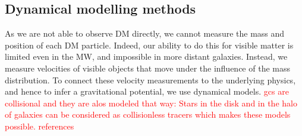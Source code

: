 \iffalse
\subsubsection{Application}
MW \acp{GC} proper motions and dynamics (including action distribution and dynamical model of potentials): \cite{Vasiliev...GCdynsGaiaDR2...2018}\\
Modelling the \ac{MW}'s \ac{GC} system: \cite{Binney...GCsystem...2017}
\fi
\subsection{Dynamical modelling methods}
As we are not able to observe \ac{DM} directly, we cannot measure the mass and position of each \ac{DM} particle. Indeed, our ability to do this for visible matter is limited even in the \ac{MW}, and impossible in more distant galaxies. Instead, we measure velocities of visible objects that move under the influence of the mass distribution. To connect these velocity measurements to the underlying physics, and hence to infer a gravitational potential, we use dynamical models. \textcolor{red}{gcs are collisional and they are alos modeled that way: Stars in the disk and in the halo of galaxies can be considered as collisionless tracers which makes these models possible.} \textcolor{red}{references}
